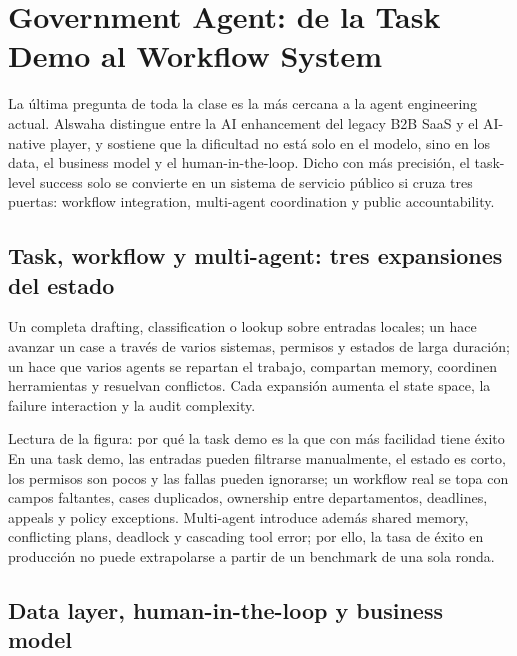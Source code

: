 \section{Government Agent: de la Task Demo al Workflow System}

La última pregunta de toda la clase es la más cercana a la agent engineering actual. Alswaha distingue entre la AI enhancement del legacy B2B SaaS y el AI-native player, y sostiene que la dificultad no está solo en el modelo, sino en los data, el business model y el human-in-the-loop. Dicho con más precisión, el task-level success solo se convierte en un sistema de servicio público si cruza tres puertas: workflow integration, multi-agent coordination y public accountability.

\subsection{Task, workflow y multi-agent: tres expansiones del estado}

Un  completa drafting, classification o lookup sobre entradas locales; un  hace avanzar un case a través de varios sistemas, permisos y estados de larga duración; un  hace que varios agents se repartan el trabajo, compartan memory, coordinen herramientas y resuelvan conflictos. Cada expansión aumenta el state space, la failure interaction y la audit complexity.


\begin{knowledgebox}{Lectura de la figura: por qué la task demo es la que con más facilidad tiene éxito}
En una task demo, las entradas pueden filtrarse manualmente, el estado es corto, los permisos son pocos y las fallas pueden ignorarse; un workflow real se topa con campos faltantes, cases duplicados, ownership entre departamentos, deadlines, appeals y policy exceptions. Multi-agent introduce además shared memory, conflicting plans, deadlock y cascading tool error; por ello, la tasa de éxito en producción no puede extrapolarse a partir de un benchmark de una sola ronda.
\end{knowledgebox}

\subsection{Data layer, human-in-the-loop y business model}

